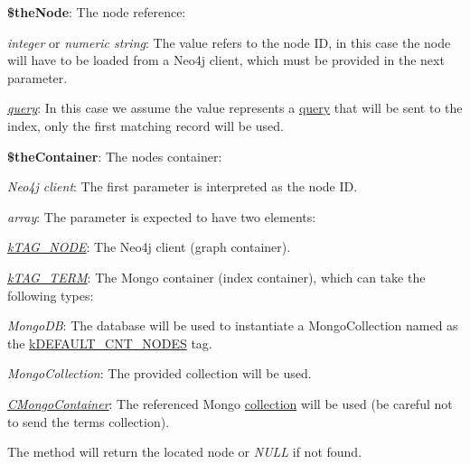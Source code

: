 \begin{DoxyItemize}
\item {\bfseries \$the\-Node}\-: The node reference\-: 
\begin{DoxyItemize}
\item {\itshape integer} or {\itshape numeric string}\-: The value refers to the node I\-D, in this case the node will have to be loaded from a Neo4j client, which must be provided in the next parameter. 
\item {\itshape \hyperlink{class_c_mongo_query}{query}}\-: In this case we assume the value represents a \hyperlink{class_c_mongo_query}{query} that will be sent to the index, only the first matching record will be used. 
\end{DoxyItemize}
\item {\bfseries \$the\-Container}\-: The nodes container\-: 
\begin{DoxyItemize}
\item {\itshape Neo4j client}\-: The first parameter is interpreted as the node I\-D. 
\item {\itshape array}\-: The parameter is expected to have two elements\-: 
\begin{DoxyItemize}
\item {\itshape \hyperlink{}{k\-T\-A\-G\-\_\-\-N\-O\-D\-E}}\-: The Neo4j client (graph container). 
\item {\itshape \hyperlink{}{k\-T\-A\-G\-\_\-\-T\-E\-R\-M}}\-: The Mongo container (index container), which can take the following types\-: 
\begin{DoxyItemize}
\item {\itshape Mongo\-D\-B}\-: The database will be used to instantiate a Mongo\-Collection named as the \hyperlink{}{k\-D\-E\-F\-A\-U\-L\-T\-\_\-\-C\-N\-T\-\_\-\-N\-O\-D\-E\-S} tag. 
\item {\itshape Mongo\-Collection}\-: The provided collection will be used. 
\item {\itshape \hyperlink{class_c_mongo_container}{C\-Mongo\-Container}}\-: The referenced Mongo \hyperlink{class_c_container_a7d10fa70dfa381cb95e66c265e2ca113}{collection} will be used (be careful not to send the terms collection). 
\end{DoxyItemize}
\end{DoxyItemize}
\end{DoxyItemize}
\end{DoxyItemize}

The method will return the located node or {\itshape N\-U\-L\-L} if not found.

